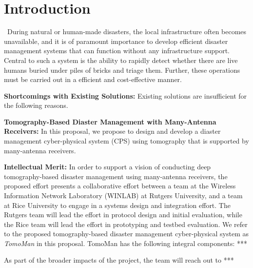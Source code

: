 \vspace{-10mm}
\section{Introduction\label{sec:intro}}
\
During natural or human-made disasters, the local infrastructure often becomes unavailable, and it is of paramount importance to develop efficient disaster management systems that can function without any infrastructure support. Central to such a system is the ability to rapidly detect whether there are live humans buried under piles of bricks and triage them. Further, these operations must be carried out in a efficient and cost-effective manner. 




\vspace{4pt}\noindent\textbf{Shortcomings with Existing Solutions:} Existing solutions are insufficient for the following reasons.

\vspace{4pt}\noindent\textbf{Tomography-Based Diaster Management with Many-Antenna Receivers:} In this proposal, we propose to design and develop a diaster management cyber-physical system (CPS) using tomography that is supported by many-antenna receivers.

\vspace{4pt}\noindent\textbf{Intellectual Merit:} In order to support a vision of conducting deep tomography-based disaster management using many-antenna receivers, the proposed effort presents a collaborative effort between a team at the Wireless Information Network Laboratory (WINLAB) at Rutgers University, and a team at Rice University to engage in a systems design and integration effort. The Rutgers team will lead the effort in protocol design and initial evaluation, while the Rice team will lead the effort in prototyping and testbed evaluation. We refer to the proposed tomography-based disaster management cyber-physical system as \emph{TomoMan} in this proposal. TomoMan has the following integral components: ***


As part of the broader impacts of the project, the team will reach out to *** 